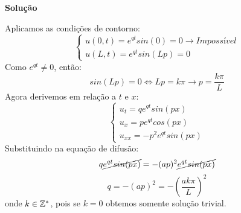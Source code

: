 \linespread{1.5}

\textbf{Solução}

Aplicamos as condições de contorno:
\begin{equation*}
    \begin{cases}
        u(0,t) = e^{qt}sin(0) = 0 \rightarrow Impossível\\
        u(L,t) = e^{qt}sin(Lp) = 0
    \end{cases}
\end{equation*}
Como $e^{qt} \neq 0$, então:
\begin{equation*}
    sin(Lp) = 0 \Longleftrightarrow Lp = k\pi \rightarrow \boxed{p = \frac{k\pi}{L}}
\end{equation*}
Agora derivemos em relação a $t$ e $x$:
\begin{equation*}
    \begin{cases}
        u_t = qe^{qt}sin(px)\\
        u_x = pe^{qt}cos(px)\\
        u_{xx} = -p^2e^{qt}sin(px)
    \end{cases}
\end{equation*}
Substituindo na equação de difusão:
\begin{equation*}
    q\cancel{e^{qt}sin(px)} = -(ap)^2\cancel{e^{qt}sin(px)}
\end{equation*}
\begin{equation*}
    q = -(ap)^2 = -\left(\frac{ak\pi}{L}\right)^2
\end{equation*}
onde $k\in\mathbb{Z}^*$, pois se $k=0$ obtemos somente solução trivial.